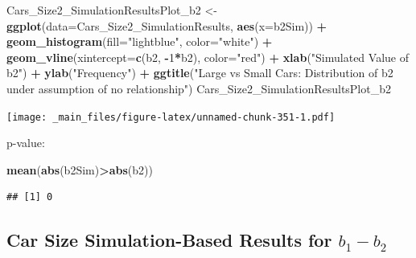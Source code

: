 \documentclass[]{book}
\newenvironment{Shaded}{\begin{snugshade}}{\end{snugshade}}
\newcommand{\KeywordTok}[1]{\textcolor[rgb]{0.13,0.29,0.53}{\textbf{#1}}}
\newcommand{\DataTypeTok}[1]{\textcolor[rgb]{0.13,0.29,0.53}{#1}}
\newcommand{\DecValTok}[1]{\textcolor[rgb]{0.00,0.00,0.81}{#1}}
\newcommand{\StringTok}[1]{\textcolor[rgb]{0.31,0.60,0.02}{#1}}
\newcommand{\OperatorTok}[1]{\textcolor[rgb]{0.81,0.36,0.00}{\textbf{#1}}}
\newcommand{\NormalTok}[1]{#1}
\begin{document}
\begin{Shaded}
\begin{Highlighting}[]
\NormalTok{Cars_Size2_SimulationResultsPlot_b2 <-}\StringTok{ }\KeywordTok{ggplot}\NormalTok{(}\DataTypeTok{data=}\NormalTok{Cars_Size2_SimulationResults, }\KeywordTok{aes}\NormalTok{(}\DataTypeTok{x=}\NormalTok{b2Sim)) }\OperatorTok{+}\StringTok{ }
\StringTok{  }\KeywordTok{geom_histogram}\NormalTok{(}\DataTypeTok{fill=}\StringTok{"lightblue"}\NormalTok{, }\DataTypeTok{color=}\StringTok{"white"}\NormalTok{) }\OperatorTok{+}\StringTok{ }
\StringTok{  }\KeywordTok{geom_vline}\NormalTok{(}\DataTypeTok{xintercept=}\KeywordTok{c}\NormalTok{(b2, }\OperatorTok{-}\DecValTok{1}\OperatorTok{*}\NormalTok{b2), }\DataTypeTok{color=}\StringTok{"red"}\NormalTok{) }\OperatorTok{+}\StringTok{ }
\StringTok{  }\KeywordTok{xlab}\NormalTok{(}\StringTok{"Simulated Value of b2"}\NormalTok{) }\OperatorTok{+}\StringTok{ }\KeywordTok{ylab}\NormalTok{(}\StringTok{"Frequency"}\NormalTok{) }\OperatorTok{+}\StringTok{ }
\StringTok{  }\KeywordTok{ggtitle}\NormalTok{(}\StringTok{"Large vs Small Cars: Distribution of b2 under assumption of no relationship"}\NormalTok{)}
\NormalTok{Cars_Size2_SimulationResultsPlot_b2}
\end{Highlighting}
\end{Shaded}

\texttt{[image: \_main\_files/figure-latex/unnamed-chunk-351-1.pdf]}

p-value:

\begin{Shaded}
\begin{Highlighting}[]
\KeywordTok{mean}\NormalTok{(}\KeywordTok{abs}\NormalTok{(b2Sim)}\OperatorTok{>}\KeywordTok{abs}\NormalTok{(b2))}
\end{Highlighting}
\end{Shaded}

\begin{verbatim}
## [1] 0
\end{verbatim}

\subsection{\texorpdfstring{Car Size Simulation-Based Results for
\(b_1-b_2\)}{Car Size Simulation-Based Results for b\_1-b\_2}}\label{car-size-simulation-based-results-for-b_1-b_2}
\end{document}

